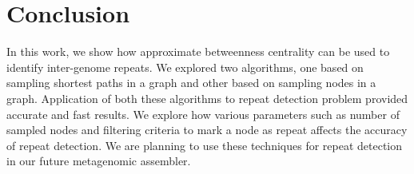 \documentclass[runningheads,a4paper]{llncs}
\begin{document}
\section{Conclusion}
In this work, we show how approximate betweenness centrality can be used to identify inter-genome repeats. We explored two algorithms, one based on sampling shortest paths in a graph and other based on sampling nodes in a graph. Application of both these algorithms to repeat detection problem provided accurate and fast results. We explore how various parameters such as number of sampled nodes and filtering criteria to mark a node as repeat affects the accuracy of repeat detection. We are planning to use these techniques for repeat detection in our future metagenomic assembler. 
{}

\end{document}
